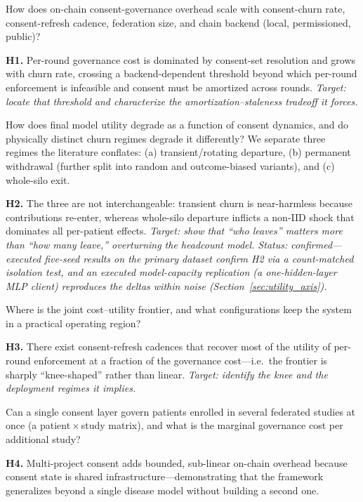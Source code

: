 \documentclass[12pt]{report}
\begin{document}
\begin{description}[leftmargin=0cm, style=unboxed, itemsep=0.9em]

\item[\textbf{RQ1 (Systems cost).}]
How does on-chain consent-governance overhead scale with consent-churn rate,
consent-refresh cadence, federation size, and chain backend (local, permissioned,
public)?

\textbf{H1.} Per-round governance cost is dominated by consent-set resolution and
grows with churn rate, crossing a backend-dependent threshold beyond which
per-round enforcement is infeasible and consent must be amortized across rounds.
\emph{Target: locate that threshold and characterize the amortization--staleness
tradeoff it forces.}

\item[\textbf{RQ2 (Utility cost and churn regimes).}]
How does final model utility degrade as a function of consent dynamics, and do
physically distinct churn regimes degrade it differently? We separate three
regimes the literature conflates: (a) transient/rotating departure, (b) permanent
withdrawal (further split into random and outcome-biased variants), and (c)
whole-silo exit.

\textbf{H2.} The three are not interchangeable: transient churn is near-harmless
because contributions re-enter, whereas whole-silo departure inflicts a non-IID
shock that dominates all per-patient effects. \emph{Target: show that ``who
leaves'' matters more than ``how many leave,'' overturning the headcount model.
Status: confirmed---executed five-seed results on the primary dataset confirm H2
via a count-matched isolation test, and an executed model-capacity replication
(a one-hidden-layer MLP client) reproduces the deltas within noise
(Section~\ref{sec:utility_axis}).}

\item[\textbf{RQ3 (The frontier).}]
Where is the joint cost--utility frontier, and what configurations keep the system
in a practical operating region?

\textbf{H3.} There exist consent-refresh cadences that recover most of the utility
of per-round enforcement at a fraction of the governance cost---i.e.\ the frontier
is sharply ``knee-shaped'' rather than linear. \emph{Target: identify the knee and
the deployment regimes it implies.}

\item[\textbf{RQ4 (Multi-project governance).}]
Can a single consent layer govern patients enrolled in several federated studies
at once (a patient\,$\times$\,study matrix), and what is the marginal governance
cost per additional study?

\textbf{H4.} Multi-project consent adds bounded, sub-linear on-chain overhead
because consent state is shared infrastructure---demonstrating that the framework
generalizes beyond a single disease model without building a second one.

\end{description}
\end{document}
